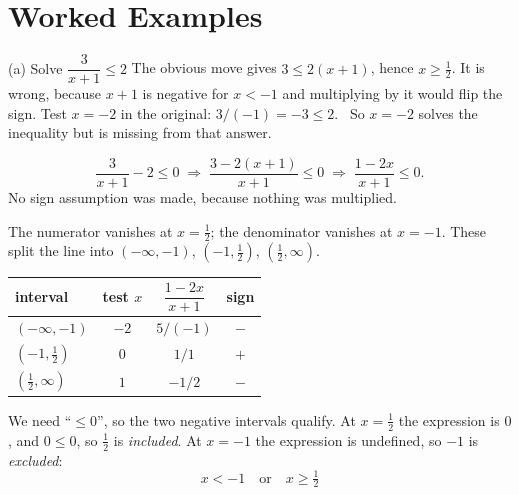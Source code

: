 \section{Worked Examples}

\begin{worked}{(a) Solve $\dfrac{3}{x+1}\le 2$}
The obvious move gives $3\le2(x+1)$, hence $x\ge\tfrac12$. It is wrong,
because $x+1$ is negative for $x<-1$ and multiplying by it would flip the
sign. Test $x=-2$ in the original: $3/(-1)=-3\le2$. \checkmark\ So $x=-2$
solves the inequality but is missing from that answer.

\[
  \frac{3}{x+1}-2\le0
  \;\Longrightarrow\;
  \frac{3-2(x+1)}{x+1}\le0
  \;\Longrightarrow\;
  \frac{1-2x}{x+1}\le0 .
\]
No sign assumption was made, because nothing was multiplied.

The numerator vanishes at $x=\tfrac12$; the denominator vanishes at $x=-1$.
These split the line into $(-\infty,-1)$, $(-1,\tfrac12)$,
$(\tfrac12,\infty)$.

\begin{center}\footnotesize
\begin{tabular}{lccc}
  \hline
  interval & test $x$ & $\dfrac{1-2x}{x+1}$ & sign\\
  \hline
  $(-\infty,-1)$ & $-2$ & $5/(-1)$ & $-$ \\
  $(-1,\tfrac12)$ & $0$ & $1/1$ & $+$ \\
  $(\tfrac12,\infty)$ & $1$ & $-1/2$ & $-$ \\
  \hline
\end{tabular}
\end{center}

We need ``$\le0$'', so the two negative intervals qualify. At $x=\tfrac12$
the expression is $0$, and $0\le0$, so $\tfrac12$ is \emph{included}. At
$x=-1$ the expression is undefined, so $-1$ is \emph{excluded}:
\[
  \boxed{x<-1\quad\text{or}\quad x\ge\tfrac12}
\]
\end{worked}

